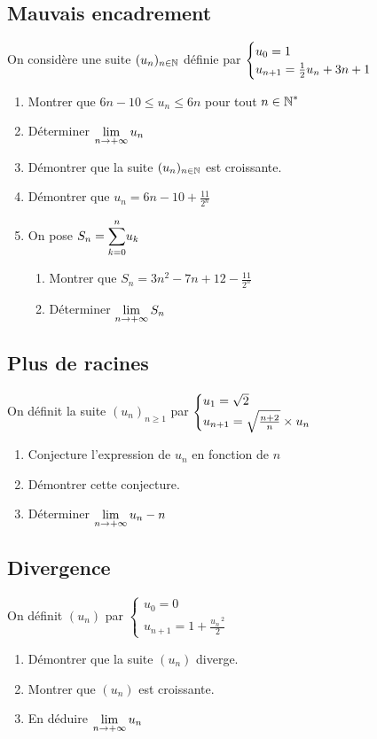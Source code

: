 \documentclass[oneside,12pt]{book}          %
\begin{document}
\subsection{Mauvais encadrement}
On considère une suite ${(u_{n})_{n\in\mathbb N}}$ définie par $\defsuite{u_0=1}{\frac{1}{2}u_n+3n+1}$
\begin{enumerate}
    \item Montrer que $6n-10\leq u_n\leq6n$ pour tout ${n\in\mathbb N}^*$
    \item Déterminer ${\lim\limits_{n\to +\infty}}\, u_n$
    \item Démontrer que la suite ${(u_{n})_{n\in\mathbb N}}$ est croissante.
    \item Démontrer que $u_n=6n-10+\frac{11}{2^n}$
    \item On pose $S_n={\displaystyle\sum_{k=0}^{n}}u_k$
    \begin{enumerate}
    	\item Montrer que $S_n=3n^2-7n+12-\frac{11}{2^n}$
    	\item Déterminer ${\lim\limits_{n\to +\infty}}\, S_n$
    \end{enumerate}
\end{enumerate}



\subsection{Plus de racines}
On définit la suite $(u_n)_{n\geq1}$ par $\defsuite{u_1=\sqrt{2}}{\sqrt{\frac{n+2}{n}}\times u_n}$
\begin{enumerate}
    \item Conjecture l'expression de $u_n$ en fonction de $n$
    \item Démontrer cette conjecture.
    \item Déterminer ${\lim\limits_{n\to +\infty}}\, u_n -n$
\end{enumerate}



\subsection{Divergence}
On définit $(u_n)$ par $\begin{cases}u_0=0\\u_{n+1}=1+\frac{u_n\,^2}{2}\end{cases}$
\begin{enumerate}
	\item Démontrer que la suite $(u_n)$ diverge.
	\item Montrer que $(u_n)$ est croissante.
	\item En déduire ${\lim\limits_{n\to +\infty}}\, u_n$
\end{enumerate}
\end{document}
